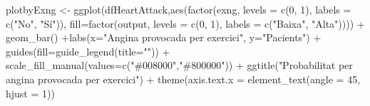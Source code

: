 \documentclass[
]{article}
\newenvironment{Shaded}{\begin{snugshade}}{\end{snugshade}}
\newcommand{\AttributeTok}[1]{\textcolor[rgb]{0.80,0.80,0.80}{#1}}
\newcommand{\DecValTok}[1]{\textcolor[rgb]{0.86,0.86,0.80}{#1}}
\newcommand{\FunctionTok}[1]{\textcolor[rgb]{0.94,0.94,0.56}{#1}}
\newcommand{\NormalTok}[1]{\textcolor[rgb]{0.80,0.80,0.80}{#1}}
\newcommand{\OtherTok}[1]{\textcolor[rgb]{0.94,0.94,0.56}{#1}}
\newcommand{\SpecialCharTok}[1]{\textcolor[rgb]{0.86,0.64,0.64}{#1}}
\newcommand{\StringTok}[1]{\textcolor[rgb]{0.80,0.58,0.58}{#1}}
\begin{document}
\begin{Shaded}
\begin{Highlighting}[]
\NormalTok{plotbyExng }\OtherTok{\textless{}{-}} \FunctionTok{ggplot}\NormalTok{(dfHeartAttack,}\FunctionTok{aes}\NormalTok{(}\FunctionTok{factor}\NormalTok{(exng, }\AttributeTok{levels =} \FunctionTok{c}\NormalTok{(}\DecValTok{0}\NormalTok{, }\DecValTok{1}\NormalTok{), }\AttributeTok{labels =} \FunctionTok{c}\NormalTok{(}\StringTok{"No"}\NormalTok{, }\StringTok{"Sí"}\NormalTok{)), }\AttributeTok{fill=}\FunctionTok{factor}\NormalTok{(output, }\AttributeTok{levels =} \FunctionTok{c}\NormalTok{(}\DecValTok{0}\NormalTok{, }\DecValTok{1}\NormalTok{), }\AttributeTok{labels =} \FunctionTok{c}\NormalTok{(}\StringTok{"Baixa"}\NormalTok{, }\StringTok{"Alta"}\NormalTok{)))) }\SpecialCharTok{+} 
                    \FunctionTok{geom\_bar}\NormalTok{() }\SpecialCharTok{+}\FunctionTok{labs}\NormalTok{(}\AttributeTok{x=}\StringTok{"Angina provocada per exercici"}\NormalTok{, }\AttributeTok{y=}\StringTok{"Pacients"}\NormalTok{) }\SpecialCharTok{+} 
                    \FunctionTok{guides}\NormalTok{(}\AttributeTok{fill=}\FunctionTok{guide\_legend}\NormalTok{(}\AttributeTok{title=}\StringTok{""}\NormalTok{)) }\SpecialCharTok{+} 
                  \FunctionTok{scale\_fill\_manual}\NormalTok{(}\AttributeTok{values=}\FunctionTok{c}\NormalTok{(}\StringTok{"\#008000"}\NormalTok{,}\StringTok{"\#800000"}\NormalTok{)) }\SpecialCharTok{+} 
                    \FunctionTok{ggtitle}\NormalTok{(}\StringTok{"Probabilitat per angina provocada per exercici"}\NormalTok{) }\SpecialCharTok{+}
          \FunctionTok{theme}\NormalTok{(}\AttributeTok{axis.text.x =} \FunctionTok{element\_text}\NormalTok{(}\AttributeTok{angle =} \DecValTok{45}\NormalTok{, }\AttributeTok{hjust =} \DecValTok{1}\NormalTok{))}


\end{Highlighting}
\end{Shaded}
\end{document}
